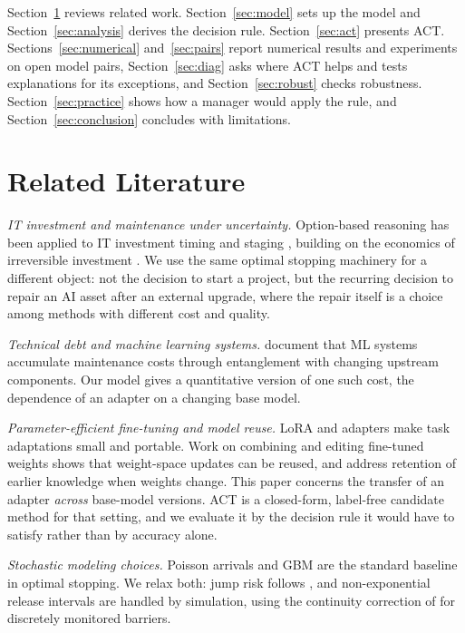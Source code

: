\documentclass[ijoc,nonblindrev]{informs4}
\begin{document}
Section~\ref{sec:lit} reviews related work. Section~\ref{sec:model} sets up the model and Section~\ref{sec:analysis} derives the
decision rule. Section~\ref{sec:act} presents ACT. Sections~\ref{sec:numerical} and~\ref{sec:pairs} report numerical results and experiments on open
model pairs, Section~\ref{sec:diag} asks where ACT helps and tests explanations for its exceptions, and Section~\ref{sec:robust} checks robustness.
Section~\ref{sec:practice} shows how a manager would apply the rule, and Section~\ref{sec:conclusion} concludes with limitations.

\section{Related Literature}\label{sec:lit}

\emph{IT investment and maintenance under uncertainty.} Option-based reasoning has been applied to IT investment
timing and staging \citep{benaroch1999case,benaroch2002managing}, building on the economics of irreversible
investment \citep{mcdonald1986value,dixit1994investment}. We use the same optimal stopping machinery for a
different object: not the decision to start a project, but the recurring decision to repair an AI asset after an
external upgrade, where the repair itself is a choice among methods with different cost and quality.

\emph{Technical debt and machine learning systems.} \citet{sculley2015hidden} document that ML systems accumulate
maintenance costs through entanglement with changing upstream components. Our model gives a quantitative version of
one such cost, the dependence of an adapter on a changing base model.

\emph{Parameter-efficient fine-tuning and model reuse.} LoRA \citep{hu2022lora} and adapters \citep{houlsby2019parameter}
make task adaptations small and portable. Work on combining and editing fine-tuned weights
\citep{ilharco2023editing} shows that weight-space updates can be reused, and \citet{kirkpatrick2017overcoming}
address retention of earlier knowledge when weights change. This paper concerns the transfer of an adapter \emph{across} base-model versions. ACT is a closed-form, label-free candidate method for that setting, and we evaluate it by the decision rule it would have to satisfy rather than by accuracy alone.

\emph{Stochastic modeling choices.} Poisson arrivals and GBM are the standard baseline in optimal stopping. We relax
both: jump risk follows \citet{merton1976option}, and non-exponential release intervals are handled by simulation,
using the continuity correction of \citet{broadie1997continuity} for discretely monitored barriers.
\end{document}
